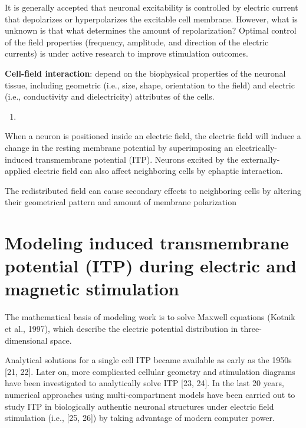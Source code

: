 It is generally accepted that neuronal excitability is controlled by electric
current that depolarizes or hyperpolarizes the excitable cell membrane.
However, what is unknown is that what determines the amount of repolarization?
Optimal control of the field properties (frequency, amplitude, and direction of
the electric currents) is under active research to improve stimulation outcomes.

{\bf Cell-field interaction}: depend on the biophysical properties of the
neuronal tissue, including geometric (i.e., size, shape, orientation to the
field) and electric (i.e., conductivity and dielectricity) attributes of the
cells.  
\begin{enumerate}
  \item 
\end{enumerate}


When a neuron is positioned inside an electric field, the electric field will
induce a change in the resting membrane potential by superimposing an
electrically-induced transmembrane potential (ITP).
Neurons excited by the externally-applied electric field can also affect
neighboring cells by ephaptic interaction.

 The redistributed field can cause secondary effects to neighboring cells by
altering their geometrical pattern and amount of membrane polarization


\section{Modeling induced transmembrane potential (ITP) during electric and
magnetic stimulation}

The mathematical basis of modeling work is to solve Maxwell equations (Kotnik et
al., 1997), which describe the electric potential distribution in
three-dimensional space.


Analytical solutions for a single cell ITP became available as early as the
1950s [21, 22]. Later on, more complicated cellular geometry and stimulation
diagrams have been investigated to analytically solve ITP [23, 24]. In the last
20 years, numerical approaches using multi-compartment models have been carried
out to study ITP in biologically authentic neuronal structures under electric
field stimulation (i.e., [25, 26]) by taking advantage of modern computer power.


